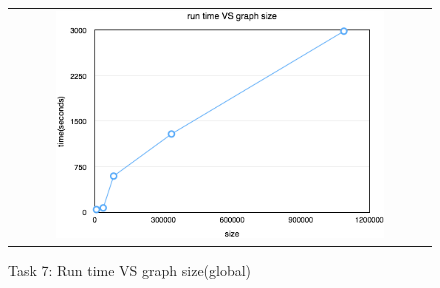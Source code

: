 \begin{figure}[h]
\begin{center}
\begin{tabular}{c}
     \includegraphics[width=0.8\textwidth]{FIG/t7_time.png}
\end{tabular}
\caption{Task 7: Run time VS graph size(global)}
\label{t7:globaltime}
\end{center}
\end{figure}

